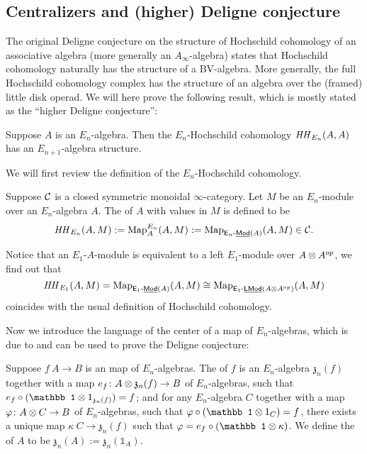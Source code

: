 \documentclass[twoside]{article}
\begin{document}
\subsection{Centralizers and (higher) Deligne conjecture}

The original Deligne conjecture on the structure of Hochschild cohomology of
an associative algebra (more generally an $A_\infty$-algebra) states that
Hochschild cohomology naturally has the structure of a BV-algebra. 
More generally, the full Hochschild cohomology complex has the structure of
an algebra over the (framed) little disk operad. We will here prove
the following result, which is mostly stated as the ``higher
Deligne conjecture'':

\begin{theorem}\label{p}
    Suppose $A$ is an $E_n$-algebra. Then the $E_n$-Hochschild cohomology 
    $\mathit{HH}_{E_n}(A,A)$ has an $E_{n+1}$-algebra structure.
\end{theorem}

We will first review the definition of the $E_n$-Hochschild cohomology.

\begin{definition}
    Suppose $\cal C$ is a closed symmetric monoidal $\infty$-category.
    Let $M$ be an $E_n$-module over an $E_n$-algebra $A$. The  of $A$ with values in $M$ is defined to be
    $$\mathit{HH}_{E_n}(A,M):=\operatorname{Map}_A^{E_n}(A,M):=\operatorname{Map}_{\mathsf{E}_n\text{-}\underline{\smash{\mathsf{Mod}}}(A)}(A,M)\in \cal C.$$
\end{definition}

\begin{remark}
    Notice that an $E_1$-$A$-module is equivalent to a left 
    $E_1$-module over $A\otimes A^{op}$, we find out that $$\mathit{HH}_{E_1}(A,M)
    =\operatorname{Map}_{\mathsf{E}_1\text{-}\underline{\smash{\mathsf{Mod}}}(A)}(A,M)\cong\operatorname{Map}_{\mathsf{E}_1\text{-}\underline{\smash{\mathsf{LMod}}}(A\otimes A^{op})}(A,M)$$ coincides
    with the usual definition of  Hochschild cohomology.
\end{remark}

Now we introduce the language of the center of a map of $E_n$-algebras, which is
due to \cite{Lur16} and can be used to prove the Deligne conjecture:

\begin{definition}
    Suppose $f\:A\to B$ is an map of $E_n$-algebras. The  of $f$
    is an $E_n$-algebra $\mathfrak z_n(f)$ together with a map 
    $e_f\colon A\otimes\mathfrak z_n(f)\to B$ of $E_n$-algebras, such that 
    $e_f\circ(\mathbb1\ox 1_{\mathfrak z_n(f)})=f$; and for any $E_n$-algebra $C$
    together with a map $\varphi\colon A\otimes C\to B$ of $E_n$-algebras, such that
    $\vp\circ(\mathbb1\ox 1_{C})=f$, there exists a unique map 
    $\kappa\:C\to\mathfrak z_n(f)$ such that $\vp=e_f\circ(\mathbb1\ox\kappa)$.
    We define the  of $A$ to be $\mathfrak z_n(A):=
    \mathfrak z_n(\mathbb1_A)$.
\end{definition}
\end{document}
